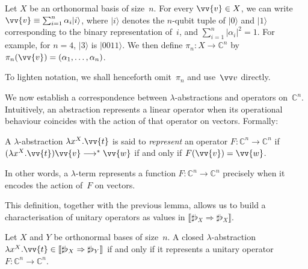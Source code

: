 \documentclass[runningheads,orivec,envcountsame,envcountsect]{llncs}
\newcommand\ket[1]{\ensuremath{|#1\rangle}}
\newcommand\lra{\longrightarrow}
\def\C{\mathbb{C}}            %
\def\Lam#1#2#3{\lambda#1^{#2}{.}#3} %
\def\eval{\lra^*}
\def\Arr{\Rightarrow}
\def\sem#1{\llbracket#1\rrbracket}
\newcommand\basis[1]{\ensuremath{\flat_{#1}}}
\begin{document}
\begin{definition}
  Let $X$ be an orthonormal basis of size~$n$. For every $\vv{v}\in X$, we can
  write
  \(
    \vv{v}\equiv \sum_{i=1}^{n}\alpha_i\ket{i}
  \),
  where $\ket{i}$ denotes the $n$-qubit tuple of $\ket{0}$ and $\ket{1}$
  corresponding to the binary representation of~$i$, and
  $\sum_{i=1}^{n}|\alpha_i|^2=1$. For example, for $n=4$, $\ket{3}$ is
  $\ket{0011}$. We then define $\pi_n:X\to\C^n$ by
  \(
    \pi_n(\vv{v}) = (\alpha_1,\dotsc,\alpha_n)
  \).
\end{definition}

To lighten notation, we shall henceforth omit~$\pi_n$ and use~$\vv v$
directly.

We now establish a correspondence between $\lambda$-abstractions and operators
on~$\C^n$. Intuitively, an abstraction represents a linear operator when its
operational behaviour coincides with the action of that operator on vectors.
Formally:

\begin{definition}
  A $\lambda$-abstraction $\Lam{x}{{X}}{\vv{t}}$ is said to \emph{represent}
  an operator $F:\C^n\to\C^n$ if
    $(\Lam{x}{{X}}{\vv{t}})\vv{v} \eval \vv{w}$
    if and only if
    $F(\vv{v}) = \vv{w}$.
\end{definition}

In other words, a $\lambda$-term represents a function
$F:\C^n\to\C^n$ precisely when it encodes the action of~$F$ on vectors.


This definition, together with the previous lemma, allows us to build a
characterisation of unitary operators as values in
$\sem{\sharp\basis{X}\Arr\sharp\basis{X}}$.

\begin{theorem}
  Let $X$ and $Y$ be orthonormal bases of size~$n$.
  A closed $\lambda$-abstraction
  $\Lam{x}{{X}}{\vv{t}}\in\sem{\sharp\basis{X}\Arr\sharp\basis{Y}}$
  if and only if it represents a unitary operator
  $F:\C^n\to\C^n$.
\end{theorem}
\end{document}
